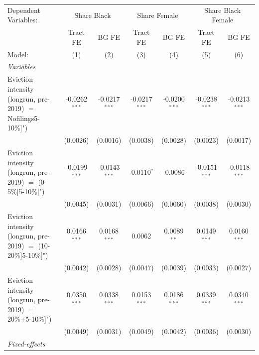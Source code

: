 \begingroup
\centering
\begin{tabular}{lcccccc}
   \tabularnewline \midrule \midrule
   Dependent Variables: & \multicolumn{2}{c}{Share Black} & \multicolumn{2}{c}{Share Female} & \multicolumn{2}{c}{Share Black Female}\\
                                                                   & Tract FE        & BG FE           & Tract FE        & BG FE           & Tract FE        & BG FE \\   
   Model:                                                          & (1)             & (2)             & (3)             & (4)             & (5)             & (6)\\  
   \midrule
   \emph{Variables}\\
   Eviction intensity (longrun, pre-2019) $=$ Nofilings5-10\%]")   & -0.0262$^{***}$ & -0.0217$^{***}$ & -0.0217$^{***}$ & -0.0200$^{***}$ & -0.0238$^{***}$ & -0.0213$^{***}$\\   
                                                                   & (0.0026)        & (0.0016)        & (0.0038)        & (0.0028)        & (0.0023)        & (0.0017)\\   
   Eviction intensity (longrun, pre-2019) $=$ (0-5\%]5-10\%]")     & -0.0199$^{***}$ & -0.0143$^{***}$ & -0.0110$^{*}$   & -0.0086         & -0.0151$^{***}$ & -0.0118$^{***}$\\   
                                                                   & (0.0045)        & (0.0031)        & (0.0066)        & (0.0060)        & (0.0038)        & (0.0030)\\   
   Eviction intensity (longrun, pre-2019) $=$ (10-20\%]5-10\%]")   & 0.0166$^{***}$  & 0.0168$^{***}$  & 0.0062          & 0.0089$^{**}$   & 0.0149$^{***}$  & 0.0160$^{***}$\\   
                                                                   & (0.0042)        & (0.0028)        & (0.0047)        & (0.0039)        & (0.0033)        & (0.0027)\\   
   Eviction intensity (longrun, pre-2019) $=$ 20\%+5-10\%]")       & 0.0350$^{***}$  & 0.0338$^{***}$  & 0.0153$^{***}$  & 0.0186$^{***}$  & 0.0339$^{***}$  & 0.0340$^{***}$\\   
                                                                   & (0.0049)        & (0.0031)        & (0.0049)        & (0.0042)        & (0.0036)        & (0.0030)\\   
   \midrule
   \emph{Fixed-effects}\\

\end{tabular}
